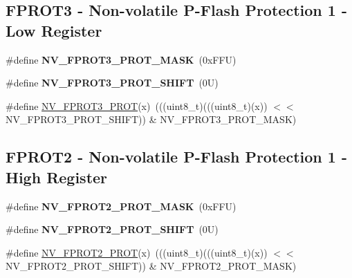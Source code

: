 \subsection*{F\+P\+R\+O\+T3 -\/ Non-\/volatile P-\/\+Flash Protection 1 -\/ Low Register}
\begin{DoxyCompactItemize}
\item 
\mbox{\label{group___n_v___register___masks_ga1a2ecc3ba1f6ae4c2db7fcaa8f369b34}} 
\#define {\bfseries N\+V\+\_\+\+F\+P\+R\+O\+T3\+\_\+\+P\+R\+O\+T\+\_\+\+M\+A\+SK}~(0x\+F\+F\+U)
\item 
\mbox{\label{group___n_v___register___masks_gaee74e224c0572f7618f28c11d921b6e3}} 
\#define {\bfseries N\+V\+\_\+\+F\+P\+R\+O\+T3\+\_\+\+P\+R\+O\+T\+\_\+\+S\+H\+I\+FT}~(0\+U)
\item 
\#define \mbox{\hyperlink{group___n_v___register___masks_ga67cd7aad5307a5ee8de3a2dd16c6315c}{N\+V\+\_\+\+F\+P\+R\+O\+T3\+\_\+\+P\+R\+OT}}(x)~(((uint8\+\_\+t)(((uint8\+\_\+t)(x)) $<$$<$ N\+V\+\_\+\+F\+P\+R\+O\+T3\+\_\+\+P\+R\+O\+T\+\_\+\+S\+H\+I\+FT)) \& N\+V\+\_\+\+F\+P\+R\+O\+T3\+\_\+\+P\+R\+O\+T\+\_\+\+M\+A\+SK)
\end{DoxyCompactItemize}
\subsection*{F\+P\+R\+O\+T2 -\/ Non-\/volatile P-\/\+Flash Protection 1 -\/ High Register}
\begin{DoxyCompactItemize}
\item 
\mbox{\label{group___n_v___register___masks_ga99b7ccf89e4d3cc80d0317086202de0f}} 
\#define {\bfseries N\+V\+\_\+\+F\+P\+R\+O\+T2\+\_\+\+P\+R\+O\+T\+\_\+\+M\+A\+SK}~(0x\+F\+F\+U)
\item 
\mbox{\label{group___n_v___register___masks_ga50f9336b86839704ca20297b040c3ca5}} 
\#define {\bfseries N\+V\+\_\+\+F\+P\+R\+O\+T2\+\_\+\+P\+R\+O\+T\+\_\+\+S\+H\+I\+FT}~(0\+U)
\item 
\#define \mbox{\hyperlink{group___n_v___register___masks_ga3361ca8560d8cdf09a1efcc0b83950fe}{N\+V\+\_\+\+F\+P\+R\+O\+T2\+\_\+\+P\+R\+OT}}(x)~(((uint8\+\_\+t)(((uint8\+\_\+t)(x)) $<$$<$ N\+V\+\_\+\+F\+P\+R\+O\+T2\+\_\+\+P\+R\+O\+T\+\_\+\+S\+H\+I\+FT)) \& N\+V\+\_\+\+F\+P\+R\+O\+T2\+\_\+\+P\+R\+O\+T\+\_\+\+M\+A\+SK)
\end{DoxyCompactItemize}
